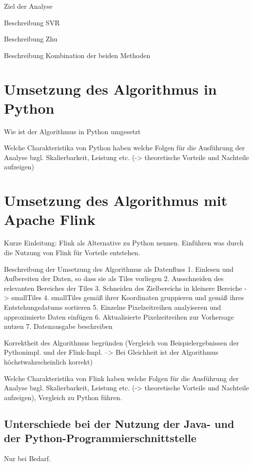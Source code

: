 Ziel der Analyse

Beschreibung SVR

Beschreibung Zhu

Beschreibung Kombination der beiden Methoden

\section{Umsetzung des Algorithmus in Python}

Wie ist der Algorithmus in Python umgesetzt

Welche Charakteristika von Python haben welche Folgen für die Ausführung der Analyse bzgl. Skalierbarkeit, Leistung etc. (-> theoretische Vorteile und Nachteile aufzeigen)

\section{Umsetzung des Algorithmus mit Apache Flink}
Kurze Einleitung: Flink als Alternative zu Python nennen.  Einführen was durch die Nutzung von Flink für Vorteile entstehen.

Beschreibung der Umsetzung des Algorithmus als Datenfluss
1. Einlesen und Aufbereiten der Daten, so dass sie als Tiles vorliegen
2. Ausschneiden des relevanten Bereiches der Tiles
3. Schneiden des Zielbereichs in kleinere Bereiche -> smallTiles
4. smallTiles gemäß ihrer Koordinaten gruppieren und gemäß ihres Entstehungsdatums sortieren
5. Einzelne Pixelzeitreihen analyiseren und approximierte Daten einfügen
6. Aktualisierte Pixelzeitreihen zur Vorhersage nutzen
7. Datenausgabe beschreiben

Korrektheit des Algorithmus begründen (Vergleich von Beispielergebnissen der Pythonimpl. und der Flink-Impl. --> Bei Gleichheit ist der Algorithmus höchstwahrscheinlich korrekt)


Welche Charakteristika von Flink haben welche Folgen für die Ausführung der Analyse bzgl. Skalierbarkeit, Leistung etc. (-> theoretische Vorteile und Nachteile aufzeigen), Vergleich zu Python führen.

\subsection{Unterschiede bei der Nutzung der Java- und der Python-Programmierschnittstelle}
Nur bei Bedarf.


